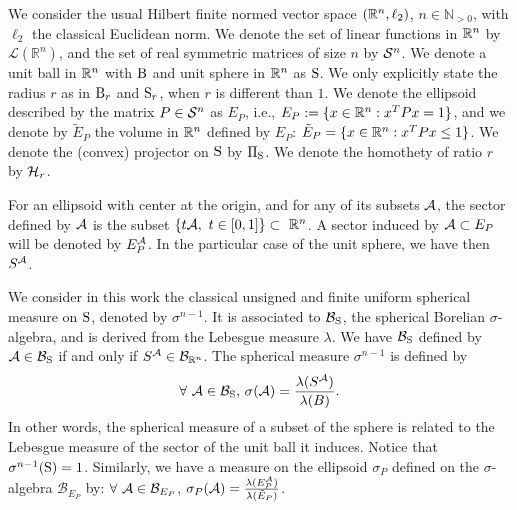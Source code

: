 We consider the usual Hilbert finite normed vector space $(\mathbb{R}^n,\ell_2)$, $n \in \mathbb{N}_{> 0}$, with $\ell_2$ the classical Euclidean norm. We denote the set of linear functions in $\mathbb{R}^n$ by $\mathcal{L}(\mathbb{R}^n)$, and the set of real symmetric matrices of size $n$ by $\mathcal{S}^n$. We denote a unit ball in $\mathbb{R}^n$ with $\text{B}$ and unit sphere in $\mathbb{R}^n$ as $\text{S}$. We only explicitly state the radius $r$ as in $\text{B}_r$ and $\text{S}_r$, when $r$ is different than $1$. We denote the ellipsoid described by the matrix $P \in \mathcal{S}^n$ as $E_P$, i.e., $E_P:= \{x \in \mathbb{R}^n: x^TPx = 1\}$, and we denote by $\tilde{E}_P$ the volume in $\mathbb{R}^n$ defined by $E_P$: $\tilde{E}_P = \{x \in \mathbb{R}^n: x^TPx \leq 1\}$. We denote the (convex) projector on $\text{S}$ by $\Pi_{\text{S}}$. We denote the homothety of ratio $r$ by $\mathcal{H}_{r}$. 


For an ellipsoid with center at the origin, and for any of its subsets $\mathcal{A}$, the sector defined by $\mathcal{A}$ is the subset $\{t \mathcal{A}, \ t \in [0,1]\} \subset\ \mathbb{R}^n$. A sector induced by $\mathcal{A} \subset E_P$ will be denoted by $E_P^{\mathcal{A}}$. In the particular case of the unit sphere, we have then $S^{\mathcal{A}}$.

We consider in this work the classical unsigned and finite uniform spherical measure on $\text{S}$, denoted by $\sigma^{n-1}$. It is associated to $\mathcal{B}_{\text{S}}$, the spherical Borelian $\sigma$-algebra, and is derived from the Lebesgue measure $\lambda$. We have $\mathcal{B}_{\text{S}}$ defined by $\mathcal{A} \in \mathcal{B}_{\text{S}}$ if and only if $S^{\mathcal{A}} \in \mathcal{B}_{\mathbb{R}^n}$. The spherical measure $\sigma^{n-1}$ is defined by
$$\forall\ \mathcal{A} \in \mathcal{B}_{\text{S}},\, \sigma(\mathcal{A}) = \frac{\lambda(S^{\mathcal{A}})}{\lambda(B)}. $$
In other words, the spherical measure of a subset of the sphere is related to the Lebesgue measure of the sector of the unit ball it induces. Notice that $\sigma^{n-1}(\text{S}) = 1$.
Similarly, we have a measure on the ellipsoid $\sigma_P$ defined on the $\sigma$-algebra $\mathcal{B}_{E_P}$ by: $\forall\ \mathcal{A} \in \mathcal{B}_{E_P}$, $\sigma_P(\mathcal{A}) = \frac{\lambda(E_P^{\mathcal{A}})}{\lambda(\tilde{E}_P)}$.
